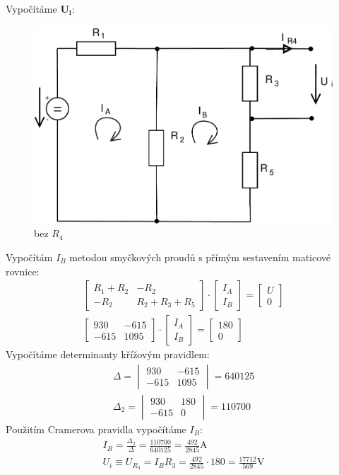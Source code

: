 \documentclass[12pt,a4paper]{article}
\begin{document}
	Vypočítáme $\boldsymbol{U_i}$:
	\begin{figure}[H]
		\center\includegraphics[width=0.6\linewidth]{obr/2_3}
		\caption*{bez $R_4$}
	\end{figure}
	Vypočítám $I_B$ metodou smyčkových proudů s přímým sestavením maticové rovnice:
	\begin{gather*}
		\begin{bmatrix}
			R_1 + R_2	&	-R_2 \\
			-R_2		&	R_2 + R_3 + R_5
		\end{bmatrix}
		\cdot
		\begin{bmatrix}
			I_A \\
			I_B
		\end{bmatrix}
		=
		\begin{bmatrix}
			U \\
			0
		\end{bmatrix}
		\\
		\begin{bmatrix}
			930		&	-615 \\
			-615	&	1095
		\end{bmatrix}
		\cdot
		\begin{bmatrix}
			I_A \\
			I_B
		\end{bmatrix}
		=
		\begin{bmatrix}
			180 \\
			0
		\end{bmatrix}
	\end{gather*}
	Vypočítáme determinanty křížovým pravidlem:
	\begin{gather*}
		\Delta = 
		\begin{vmatrix}
			930		&	-615 \\
			-615	&	1095
		\end{vmatrix}
		= 640125 \\
		\Delta_2 = 
		\begin{vmatrix}
			930		&	180 \\
			-615	&	0
		\end{vmatrix}
		= 110700
	\end{gather*}
	Použitím Cramerova pravidla vypočítáme $I_B$:
	\begin{gather*}
		I_B = \frac{\Delta_2}{\Delta} = \frac{110700}{640125} = \frac{492}{2845} \text{A} \\
		U_i \equiv U_{R_3} = I_B R_3 = \frac{492}{2845} \cdot 180 = \frac{17712}{569} \text{V}
	\end{gather*}
\end{document}
